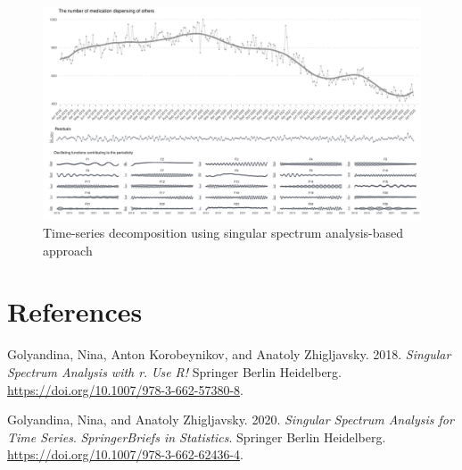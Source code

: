 \documentclass[
  letterpaper,
  DIV=11,
  numbers=noendperiod]{scrartcl}
\newlength{\cslhangindent}
\newenvironment{CSLReferences}[2] %
 {\begin{list}{}{%
  \setlength{\itemindent}{0pt}
  \setlength{\leftmargin}{0pt}
  \setlength{\parsep}{0pt}
  \ifodd #1
   \setlength{\leftmargin}{\cslhangindent}
   \setlength{\itemindent}{-1\cslhangindent}
  \fi
  \setlength{\itemsep}{#2\baselineskip}}}
 {\end{list}}
\begin{document}
\begin{figure}[H]

{\centering \includegraphics[width=1\linewidth,height=\textheight,keepaspectratio]{supplementary_files/figure-pdf/unnamed-chunk-2-23.pdf}

}

\caption{Time-series decomposition using singular spectrum
analysis-based approach}

\end{figure}%

\section*{References}\label{references}

\label{refs}
\begin{CSLReferences}{1}{0}
Golyandina, Nina, Anton Korobeynikov, and Anatoly Zhigljavsky. 2018.
\emph{Singular Spectrum Analysis with r}. \emph{Use R!} Springer Berlin
Heidelberg. \url{https://doi.org/10.1007/978-3-662-57380-8}.

Golyandina, Nina, and Anatoly Zhigljavsky. 2020. \emph{Singular Spectrum
Analysis for Time Series}. \emph{SpringerBriefs in Statistics}. Springer
Berlin Heidelberg. \url{https://doi.org/10.1007/978-3-662-62436-4}.

\end{CSLReferences}
\end{document}
